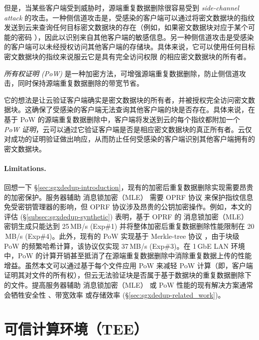 但是，当某些客户端受到威胁时，源端重复数据删除很容易受到 \textit{ side-channel attack} \cite{harnik10,halevi11} 的攻击。一种侧信道攻击是，受感染的客户端可以通过将密文数据块的指纹发送到云来查询任何目标密文数据块的存在（例如，如果密文数据块对应于某个可能的密码 \cite{harnik10}），因此以识别来自其​​他客户端的敏感信息。另一种侧信道攻击是受感染的客户端可以未经授权访问其他客户端的存储块。具体来说，它可以使用任何目标密文数据块的指纹来说服云它是具有完全访问权限 \cite{halevi11} 的相应密文数据块的所有者。


\textit{ 所有权证明 (PoW)} \cite{halevi11} 是一种加密方法，可增强源端重复数据删除，防止侧信道攻击，同时保持源端重复数据删除的带宽节省。

它的想法是让云验证客户端确实是密文数据块的所有者，并被授权完全访问密文数据块。这确保了受感染的客户端无法查询其他客户端的块是否存在。具体来说，在基于 PoW 的源端重复数据删除中，客户端将发送到云的每个指纹都附加一个 \textit{ PoW 证明}，云可以通过它验证客户端是否是相应密文数据块的真正所有者。云仅对成功的证明验证做出响应，从而防止任何受感染的客户端识别其他客户端拥有的密文数据块。 

\paragraph*{Limitations.} 回想一下 \S\ref{sec:sgxdedup-introduction}，现有的加密后重复数据删除实现需要昂贵的加密保护。服务器辅助 消息锁加密（MLE） 需要 OPRF 协议 \cite{naor2004Number} 来保护指纹信息免受密钥管理器的影响，但 OPRF 协议涉及昂贵的公钥加密操作。例如，本文的评估 (\S\ref{subsec:sgxdedup-synthetic}) 表明，基于 OPRF 的 消息锁加密（MLE） 密钥生成只能达到 25\,MB/s (Exp\#1) 并将整体加密后重复数据删除性能限制在 20 \,MB/s (Exp\#4)。此外，现有的 PoW 实现基于 Merkle-tree 协议 \cite{halevi11}，由于块级 PoW 的频繁哈希计算，该协议仅实现 37\,MB/s (Exp\#3)。在 1\,GbE LAN 环境中，PoW 的计算开销甚至抵消了在源端重复数据删除中消除重复数据上传的性能增益。虽然本文可以通过基于每个文件应用 PoW 来减轻 PoW 计算（即，客户端证明其对文件的所有权），但云无法验证块是否属于基于数据块的重复数据删除下的文件。提高服务器辅助 消息锁加密（MLE） 或 PoW 性能的现有解决方案通常会牺牲安全性 \cite{li20b,xu2013weak,pietro12}、带宽效率 \cite{harnik10,li15} 或存储效率 \cite{zhou2015secdep,qin17,li20b} (\S\ref{sec:sgxdedup-related_work})。


\section{可信计算环境（TEE）}
\label{sec:background-tee}


